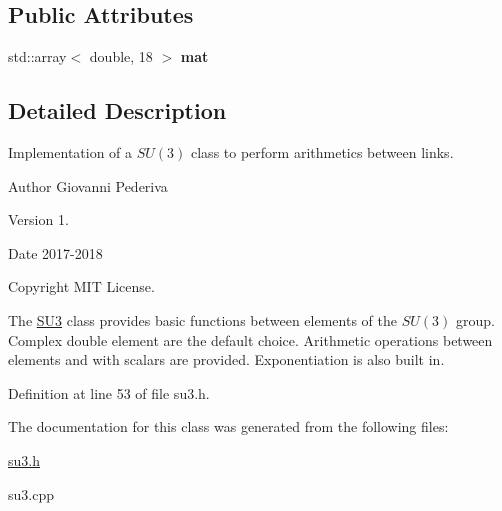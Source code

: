 \subsection*{Public Attributes}
\begin{DoxyCompactItemize}
\item 
std\+::array$<$ double, 18 $>$ {\bfseries mat}\hypertarget{structSU3_acf8e4278a5ad59ae35c0c6cbc1e81685}{}\label{structSU3_acf8e4278a5ad59ae35c0c6cbc1e81685}

\end{DoxyCompactItemize}


\subsection{Detailed Description}
Implementation of a $SU(3)$ class to perform arithmetics between links. 

\begin{DoxyAuthor}{Author}
Giovanni Pederiva 
\end{DoxyAuthor}
\begin{DoxyVersion}{Version}
1. 
\end{DoxyVersion}
\begin{DoxyDate}{Date}
2017-\/2018 
\end{DoxyDate}
\begin{DoxyCopyright}{Copyright}
M\+IT License.
\end{DoxyCopyright}
The \hyperlink{structSU3}{S\+U3} class provides basic functions between elements of the $SU(3)$ group. Complex double element are the default choice. Arithmetic operations between elements and with scalars are provided. Exponentiation is also built in. 

Definition at line 53 of file su3.\+h.



The documentation for this class was generated from the following files\+:\begin{DoxyCompactItemize}
\item 
\hyperlink{su3_8h}{su3.\+h}\item 
su3.\+cpp\end{DoxyCompactItemize}
